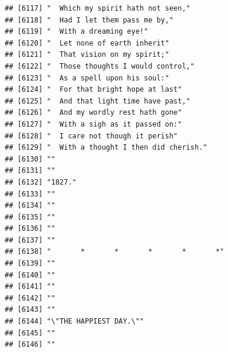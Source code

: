 \documentclass{article}\usepackage[]{graphicx}\usepackage[]{color}
\makeatletter
\newenvironment{kframe}{%
 \def\at@end@of@kframe{}%
 \ifinner\ifhmode%
  \def\at@end@of@kframe{\end{minipage}}%
  \begin{minipage}{\columnwidth}%
 \fi\fi%
 \def\FrameCommand##1{\hskip\@totalleftmargin \hskip-\fboxsep
 \colorbox{shadecolor}{##1}\hskip-\fboxsep
     \hskip-\linewidth \hskip-\@totalleftmargin \hskip\columnwidth}%
 \MakeFramed {\advance\hsize-\width
   \@totalleftmargin\z@ \linewidth\hsize
   \@setminipage}}%
 {\par\unskip\endMakeFramed%
 \at@end@of@kframe}
\newenvironment{knitrout}{}{} %
\makeatother
\begin{document}
\begin{knitrout}
\begin{kframe}
\begin{verbatim}
## [6117] "  Which my spirit hath not seen,"                                            
## [6118] "  Had I let them pass me by,"                                                
## [6119] "  With a dreaming eye!"                                                      
## [6120] "  Let none of earth inherit"                                                 
## [6121] "  That vision on my spirit;"                                                 
## [6122] "  Those thoughts I would control,"                                           
## [6123] "  As a spell upon his soul:"                                                 
## [6124] "  For that bright hope at last"                                              
## [6125] "  And that light time have past,"                                            
## [6126] "  And my wordly rest hath gone"                                              
## [6127] "  With a sigh as it passed on:"                                              
## [6128] "  I care not though it perish"                                               
## [6129] "  With a thought I then did cherish."                                        
## [6130] ""                                                                            
## [6131] ""                                                                            
## [6132] "1827."                                                                       
## [6133] ""                                                                            
## [6134] ""                                                                            
## [6135] ""                                                                            
## [6136] ""                                                                            
## [6137] ""                                                                            
## [6138] "       *       *       *       *       *"                                    
## [6139] ""                                                                            
## [6140] ""                                                                            
## [6141] ""                                                                            
## [6142] ""                                                                            
## [6143] ""                                                                            
## [6144] "\"THE HAPPIEST DAY.\""                                                       
## [6145] ""                                                                            
## [6146] ""                                                                            

\end{verbatim}
\end{kframe}
\end{knitrout}
\end{document}
